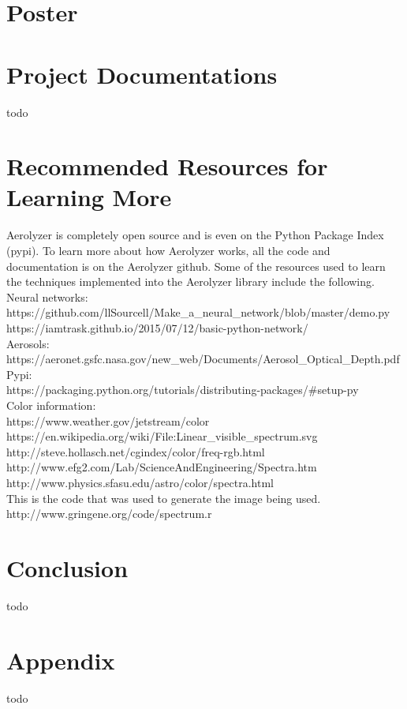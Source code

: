 \documentclass[onecolumn, draftclsnofoot,10pt, compsoc]{IEEEtran}
\begin{document}
\begin{singlespace}
	\section{Poster}
		
	\section{Project Documentations}
		todo
	\section{Recommended Resources for Learning More}
		Aerolyzer is completely open source and is even on the Python Package Index (pypi).
		To learn more about how Aerolyzer works, all the code and documentation is on the Aerolyzer github.
		Some of the resources used to learn the techniques implemented into the Aerolyzer library include the following.
		Neural networks:\\
		https://github.com/llSourcell/Make_a_neural_network/blob/master/demo.py \\
		https://iamtrask.github.io/2015/07/12/basic-python-network/ \\

		Aerosols:\\
		https://aeronet.gsfc.nasa.gov/new_web/Documents/Aerosol_Optical_Depth.pdf \\

		Pypi:\\
		https://packaging.python.org/tutorials/distributing-packages/#setup-py \\
		
		Color information: \\
		https://www.weather.gov/jetstream/color \\
		https://en.wikipedia.org/wiki/File:Linear_visible_spectrum.svg \\
		http://steve.hollasch.net/cgindex/color/freq-rgb.html \\
		http://www.efg2.com/Lab/ScienceAndEngineering/Spectra.htm \\
		http://www.physics.sfasu.edu/astro/color/spectra.html \\

		This is the code that was used to generate the image being used. \\
		http://www.gringene.org/code/spectrum.r \\


	\section{Conclusion}
		todo \cite{neural}
	\section{Appendix}
		todo
\end{singlespace}
\clearpage


\end{document}
